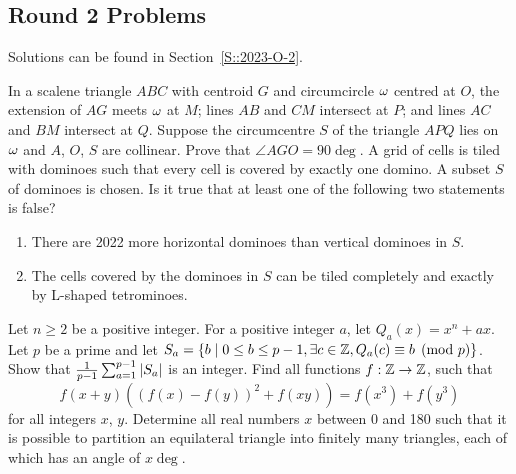 \subsection{Round 2 Problems}

Solutions can be found in Section~\ref{S::2023-O-2}.

\begin{enumerate}
    \hyperrefitem[A::2023-O-2-1] In a scalene triangle $ABC$ with centroid $G$ and circumcircle $\omega$ centred at $O$, the extension of $AG$ meets $\omega$ at $M$; lines $AB$ and $CM$ intersect at $P$; and lines $AC$ and $BM$ intersect at $Q$. Suppose the circumcentre $S$ of the triangle $APQ$ lies on $\omega$ and $A$, $O$, $S$ are collinear. Prove that $\angle AGO = 90\deg$.
    \hyperrefitem[A::2023-O-2-2] A grid of cells is tiled with dominoes such that every cell is covered by exactly one domino. A subset $S$ of dominoes is chosen. Is it true that at least one of the following two statements is false?
    \begin{enumerate}
        \item There are 2022 more horizontal dominoes than vertical dominoes in $S$.
        \item The cells covered by the dominoes in $S$ can be tiled completely and exactly by L-shaped tetrominoes.
    \end{enumerate}
    \hyperrefitem[A::2023-O-2-3] Let $n \geq 2$ be a positive integer. For a positive integer $a$, let $Q_a(x) = x^n + ax$. Let $p$ be a prime and let $S_a = \left\lbrace b \mid 0 \leq b \leq p - 1, \exists c \in \mathbb{Z}, Q_a(c) \equiv b \pmod{p} \right\rbrace$. Show that $\frac{1}{p-1} \sum_{a=1}^{p-1} \left\lvert S_a \right\rvert$ is an integer.
    \hyperrefitem[A::2023-O-2-4] Find all functions $f : \mathbb{Z} \to \mathbb{Z}$, such that \[f(x+y)((f(x) - f(y))^2 + f(xy)) = f(x^3) + f(y^3)\] for all integers $x$, $y$.
    \hyperrefitem[A::2023-O-2-5] Determine all real numbers $x$ between 0 and 180 such that it is possible to partition an equilateral triangle into finitely many triangles, each of which has an angle of $x\deg$.
\end{enumerate}
